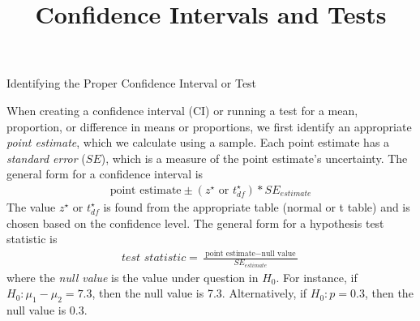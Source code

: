 \documentclass[11pt]{article}
\title{Confidence Intervals and Tests}
\date{}                                           %
\begin{document}

\begin{center}
\Large Identifying the Proper Confidence Interval or Test \normalsize
\end{center} 

\vspace{2mm}\noindent When creating a confidence interval (CI) or running a test for a mean, proportion, or difference in means or proportions, we first identify an appropriate \emph{point estimate}, which we calculate using a sample. Each point estimate has a \emph{standard error} ($SE$), which is a measure of the point estimate's uncertainty. The general form for a confidence interval is 
\small
\begin{eqnarray*}
\text{point estimate} \pm (z^{\star}\text{ or }t_{df}^{\star})*SE_{estimate}
\end{eqnarray*}
\normalsize
The value $z^{\star}$ or $t_{df}^{\star}$ is found from the appropriate table (normal or t table) and is chosen based on the confidence level. The general form for a hypothesis test statistic is
\small
\begin{eqnarray*}
\textit{test statistic} = \frac{\ \text{point estimate} - \text{null value}\ }{SE_{estimate}}
\end{eqnarray*}
\normalsize
where the \emph{null value} is the value under question in $H_0$. For instance, if $H_0: \mu_1-\mu_2=7.3$,  then the null value is 7.3. Alternatively, if $H_0: p=0.3$, then the null value is 0.3. \\
\end{document}
